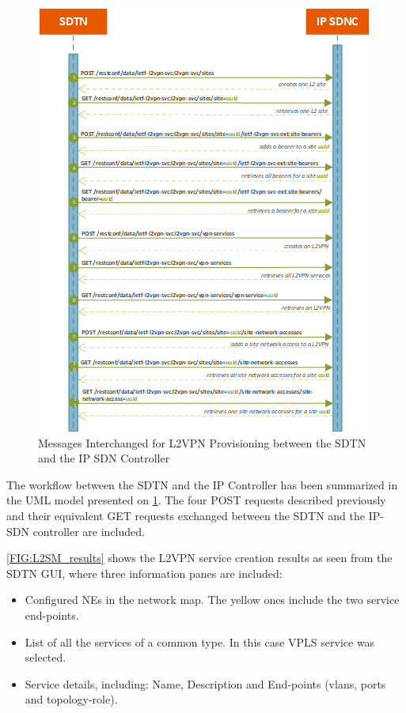 \documentclass[a4paper,fleqn]{cas-dc}
\begin{document}
\begin{figure}
	\centering
		\includegraphics[width=\linewidth]{figs/l2sm_workflow_2.png}
	\caption{Messages Interchanged for L2VPN Provisioning between the SDTN and the IP SDN Controller}
	\label{FIG:L2SM_workflow}
\end{figure}

The workflow between the SDTN and the IP Controller has been summarized in the UML model presented on \ref{FIG:L2SM_workflow}. The four POST requests described previously and their equivalent GET requests exchanged between the SDTN and the IP-SDN controller are included. 

\ref{FIG:L2SM_results} shows the L2VPN service creation results as seen from the SDTN GUI, where three information panes are included: 
\begin{itemize}
    \item Configured NEs in the network map. The yellow ones include the two service end-points.
    \item List of all the services of a common type. In this case VPLS service was selected. 
    \item Service details, including: Name, Description and End-points (vlans, ports and topology-role). 
\end{itemize}
\end{document}
